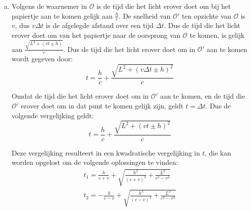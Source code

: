 \documentclass[12pt, dutch, a4paper]{article}
\begin{document}
\begin{enumerate}[(a).]
    \item \label{iteme}
    Volgens de waarnemer in $\mathcal{O}$ is de tijd die het licht erover doet om bij
    het papiertje aan te komen gelijk aan $\frac{h}{c}$. 
    De snelheid van $\mathcal{O}'$ ten opzichte van $\mathcal{O}$ is $v$,
    dus $v \Delta t$ is de afgelegde afstand over een tijd $\Delta t$.
    Dus de tijd die het licht erover doet om van het papiertje naar de oorsprong van
    $\mathcal{O}$ te komen, is gelijk aan $\frac{\sqrt{L^2 + (vt \pm h)}}{c}$.
    Dus de tijd die het licht erover doet om in $\mathcal{O}'$ aan te komen 
    wordt gegeven door:
    \begin{equation}
        t = \frac{h}{c} + \frac{\sqrt{L^2 + \left(v \Delta t \pm h\right)^2}}{c}
    \end{equation}
    
    \newpage
    Omdat de tijd die het licht erover doet om in $\mathcal{O}'$ aan te komen,
    en de tijd die $\mathcal{O}'$ erover doet om in dat punt te komen gelijk zijn,
    geldt $t = \Delta t$. Dus de volgende vergelijking geldt:
    \begin{equation}
        t = \frac{h}{c} + \frac{\sqrt{L^2 + \left(vt \pm h\right)^2}}{c}
    \end{equation}

    Deze vergelijking resulteert in een kwadratische vergelijking in $t$, 
    die kan worden opgelost om de volgende oplossingen te vinden:
    \begin{equation}
        \begin{split}
            t_1 = \frac{h}{c + v}+\sqrt{\frac{h^{2}}{\left(c + v\right)^{2}}+\frac{L^{2}}{c^{2}-v^{2}}}\\
            t_2 = -\frac{h}{c - v}+\sqrt{\frac{h^{2}}{\left(c - v\right)^{2}}+\frac{L^{2}}{c^{2}-v^{2}}}  
        \end{split}
    \end{equation}
    

\end{enumerate}
\end{document}
